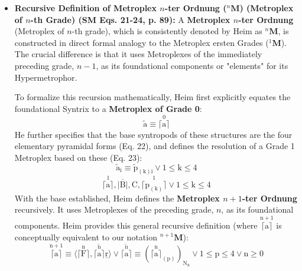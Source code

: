 \documentclass[12pt]{article}
\newcommand{\metroplex}[1]{{}^{#1}\mathbf{M}}
\newcommand{\hypersyntrix}{\metroplex{1}}
\begin{document}
\begin{itemize}
    \item \textbf{Recursive Definition of Metroplex \( n \)-ter Ordnung (\( \metroplex{n} \)) (Metroplex of \(n\)-th Grade) (SM Eqs. 21-24, p. 89):}
    A \textbf{Metroplex \( n \)-ter Ordnung} (Metroplex of \( n \)-th grade), which is consistently denoted by Heim as \( \metroplex{n} \), is constructed in direct formal analogy to the Metroplex ersten Grades (\( \hypersyntrix \)). The crucial difference is that it uses Metroplexes of the immediately preceding grade, \( n-1 \), as its foundational components or "elements" for its Hypermetrophor. 
    
    To formalize this recursion mathematically, Heim first explicitly equates the foundational Syntrix to a \textbf{Metroplex of Grade 0}:
    \begin{equation}
    \tilde{\mathrm{a}} \equiv \overset{0}{\lceil\mathrm{a}\rceil} \tag{21}
    \end{equation}
    He further specifies that the base syntropods of these structures are the four elementary pyramidal forms (Eq. 22), and defines the resolution of a Grade 1 Metroplex based on these (Eq. 23):
    \begin{equation}
    \tilde{\mathrm{a}}_{\mathrm{i}} \equiv \tilde{\mathrm{p}}_{(\mathrm{k})\mathrm{i}} \vee 1 \le \mathrm{k} \le 4 \tag{22}
    \end{equation}
    \begin{equation}
    \overset{1}{\lceil\mathrm{a}\rceil}, \overline{|\mathrm{B}|}, \mathrm{C}, \overset{1}{\lceil\mathrm{p}_{(\mathrm{k})}\rceil} \vee 1 \le \mathrm{k} \le 4 \tag{23}
    \end{equation}
    With the base established, Heim defines the \textbf{Metroplex \( n+1 \)-ter Ordnung} recursively. It uses Metroplexes of the preceding grade, \( n \), as its foundational components. Heim provides this general recursive definition (where \( \overset{\mathrm{n+1}}{\lceil\mathrm{a}\rceil} \) is conceptually equivalent to our notation \( \metroplex{n+1} \)):
    \begin{equation}
    \overset{\mathrm{n}+1}{\lceil\mathrm{a}\rceil} \equiv \langle \overset{\mathrm{n}}{\lceil\mathrm{F}\rceil}, \overset{\tilde{\mathrm{n}}}{\lceil\mathrm{a}\rceil} \underline{\mathrm{r}} \rangle \vee \overset{\tilde{\mathrm{n}}}{\lceil\mathrm{a}\rceil} \equiv ( \overset{\mathrm{n}}{\lceil\mathrm{a}\rceil}_{(\mathrm{p})} )_{\mathrm{N}_{\mathrm{n}}} \vee 1 \le \mathrm{p} \le 4 \vee \mathrm{n} \ge 0 
    \label{eq:original_metroplex_n_formal}

\end{equation}
\end{itemize}
\end{document}
